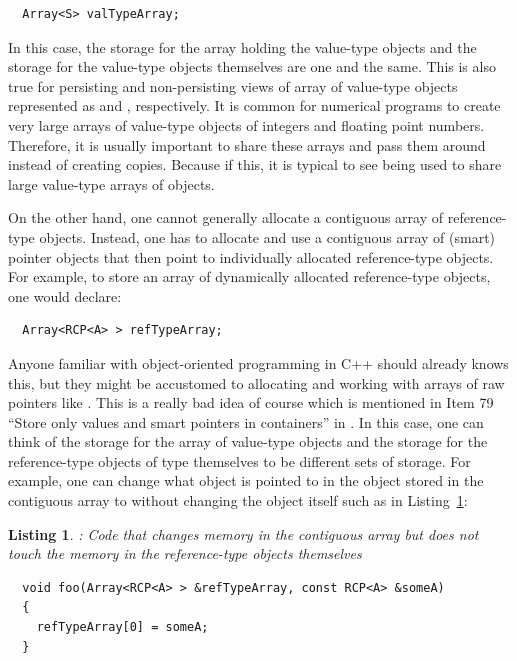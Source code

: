\documentclass[pdf,ps2pdf,11pt]{SANDreport}
\newtheorem{listing}{Listing}
\begin{document}
{\small\begin{verbatim}
  Array<S> valTypeArray;
\end{verbatim}}

In this case, the storage for the array holding the value-type objects
and the storage for the value-type objects themselves are one and the
same.  This is also true for persisting and non-persisting views of
array of value-type objects represented as {}
and {}, respectively.  It is common for
numerical programs to create very large arrays of value-type objects
of integers and floating point numbers.  Therefore, it is usually
important to share these arrays and pass them around instead of
creating copies.  Because if this, it is typical to see
{} being used to share large value-type
arrays of objects.

On the other hand, one cannot generally allocate a contiguous array of
reference-type objects.  Instead, one has to allocate and use a
contiguous array of (smart) pointer objects that then point to
individually allocated reference-type objects.  For example, to store
an array of dynamically allocated reference-type objects, one would
declare:

{\small\begin{verbatim}
  Array<RCP<A> > refTypeArray;
\end{verbatim}}

Anyone familiar with object-oriented programming in C++ should already
knows this, but they might be accustomed to allocating and working
with arrays of raw pointers like {}.  This is a
really bad idea of course which is mentioned in Item 79 ``Store only
values and smart pointers in containers'' in
{}\cite{C++CodingStandards05}.  In this case, one can think of the
storage for the array of {} value-type objects and the
storage for the reference-type objects of type {} themselves to
be different sets of storage.  For example, one can change what
{} object is pointed to in the {} object stored in
the contiguous array to without changing the {} object itself
such as in Listing~\ref{listing:change-array-not-ref-type-objs}:


{}\begin{listing}: Code that changes memory in the contiguous array
but does not touch the memory in the reference-type objects themselves
\label{listing:change-array-not-ref-type-objs}
{\small\begin{verbatim}
  void foo(Array<RCP<A> > &refTypeArray, const RCP<A> &someA)
  {
    refTypeArray[0] = someA;
  }
\end{verbatim}}
\end{listing}
\end{document}

